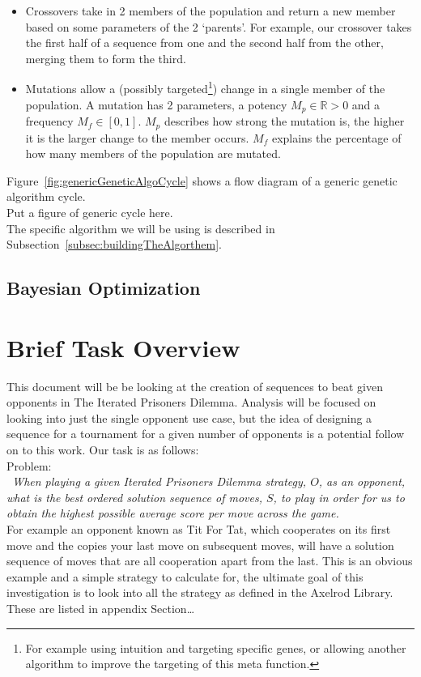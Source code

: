 \begin{itemize}
    \item Crossovers take in 2 members of the population and return a new member based on some parameters of the 2 `parents'.
    For example, our crossover takes the first half of a sequence from one and the second half from the other, merging them to form the third.
    \item Mutations allow a (possibly targeted\footnote{For example using intuition and targeting specific genes, or allowing another algorithm to improve the targeting of this meta function.}) change in a single member of the population.
    A mutation has 2 parameters, a potency \(M_p\in \mathbb{R}>0\) and a frequency \(M_f\in [0,1]\).
    \(M_p\) describes how strong the mutation is, the higher it is the larger change to the member occurs.
    \(M_f\) explains the percentage of how many members of the population are mutated.
\end{itemize}
Figure~\ref{fig:genericGeneticAlgoCycle} shows a flow diagram of a generic genetic algorithm cycle.\\

Put a figure of generic cycle here.\label{fig:genericGeneticAlgoCycle} \\

The specific algorithm we will be using is described in Subsection~\ref{subsec:buildingTheAlgorthem}.

\subsection{Bayesian Optimization}\label{subsec:bayesianOptimization}
\section{Brief Task Overview}\label{sec:briefOverview}
This document will be be looking at the creation of sequences to beat given opponents in The Iterated Prisoners Dilemma.
Analysis will be focused on looking into just the single opponent use case, but the idea of designing a sequence for a tournament for a given number of opponents is a potential follow on to this work.
Our task is as follows:\\

Problem:\\{\itshape~When playing a given Iterated Prisoners Dilemma strategy, \(O\), as an opponent, what is the best ordered solution sequence of moves, \(S\), to play in order for us to obtain the highest possible average score per move across the game.}\\

For example an opponent known as Tit For Tat, which cooperates on its first move and the copies your last move on subsequent moves, will have a solution sequence of moves that are all cooperation apart from the last.
This is an obvious example and a simple strategy to calculate for, the ultimate goal of this investigation is to look into all the strategy as defined in the Axelrod Library.
These are listed in appendix Section\ldots
